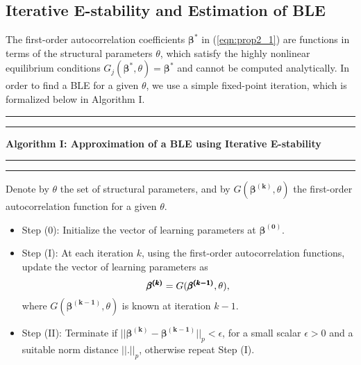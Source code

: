 \subsection*{Iterative E-stability and Estimation of BLE} 


The first-order autocorrelation coefficients $\pmb{\beta}^{*}$ in (\ref{eqn:prop2_1}) are functions in terms of the structural parameters $\theta$, which satisfy the highly nonlinear equilibrium conditions $G_j(\pmb{ \beta}^{*},\theta)=\pmb{\beta}^{*}$ and cannot be computed analytically. In order to find a BLE for a given $\theta$, we use a simple fixed-point iteration, which is formalized below in Algorithm I. 


\begin{table}[!htbp]

\hrule
\hrule

\vspace{2 mm}
{\textbf{Algorithm I: Approximation of a BLE using Iterative E-stability}}

\vspace{2 mm}

\hrule
\hrule


\vspace{2 mm}
Denote by $\theta$ the set of structural parameters, and by $G(\pmb{ \beta^{(k)}},\theta)$ the first-order autocorrelation function for a given $\theta$.


\begin{itemize}
\item{Step (0)}: Initialize the vector of learning parameters at ${\pmb{\beta^{(0)}}}$.
\item{Step (I)}: At each iteration $k$, using the first-order autocorrelation functions, update the vector of learning parameters as
\begin{equation}
\pmb{\beta^{(k)}}=G(\pmb{ \beta^{(k-1)}},\theta),\\
\label{eqn:2_15}
\end{equation}
where $G(\pmb{\beta^{(k-1)}},\theta)$ is known at iteration $k-1$.
\item{Step (II)}: Terminate if $||\pmb{ \beta^{(k)}} -\pmb{ \beta^{(k-1)}}||_{p} < \epsilon $, for a small scalar $\epsilon>0$
\noindent and a suitable norm distance $||.||_{p}$, otherwise repeat Step (I). 
\end{itemize}


\end{table}
